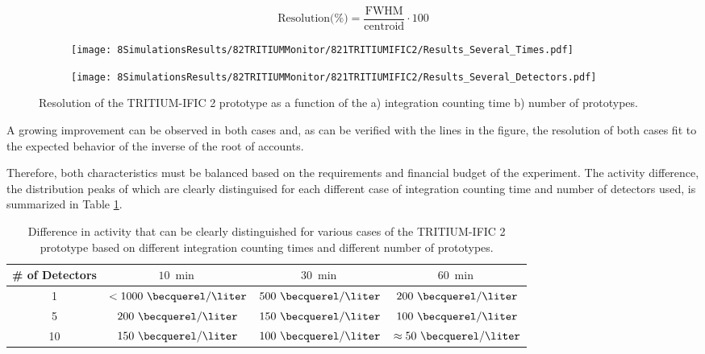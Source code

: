 \begin{equation}
\text{Resolution(\%)}=\frac{\text{FWHM}}{\text{centroid}}\cdot{}100
\label{eq:Resolution}
\end{equation}

\begin{figure}
\centering
    \begin{subfigure}[b]{0.45\textwidth}
    \centering
    \texttt{[image: 8SimulationsResults/82TRITIUMMonitor/821TRITIUMIFIC2/Results\_Several\_Times.pdf]}  
    \caption{\label{subfig:ResolutionvsIntegrationCoutingTime}}
    \end{subfigure}
    \hfill
    \begin{subfigure}[b]{0.45\textwidth}
    \centering
    \texttt{[image: 8SimulationsResults/82TRITIUMMonitor/821TRITIUMIFIC2/Results\_Several\_Detectors.pdf]}  
    \caption{\label{subfig:ResolutionvsNumberDetectors}}
    \end{subfigure}
 \caption{Resolution of the TRITIUM-IFIC 2 prototype as a function of the a) integration counting time b) number of prototypes.}
 \label{fig:Resolution}
\end{figure}

A growing improvement can be observed in both cases and, as can be verified with the lines in the figure, the resolution of both cases fit to the expected behavior of the inverse of the root of accounts.

Therefore, both characteristics must be balanced based on the requirements and financial budget of the experiment. The activity difference, the distribution peaks of which are clearly distinguised for each different case of integration counting time and number of detectors used, is summarized in Table \ref{tab:DifferentCasesOfTI2}.

\begin{table}[h]
\begin{center}
\begin{tabular}{|c|c|c|c|}
\hline
\# of Detectors & $10~\min$ & $30~\min$ & $60~\min$\\
\hline \hline \hline
1 & $<1000~\becquerel/\liter$ & $500~\becquerel/\liter$ & $200~\becquerel/\liter$ \\ \hline
5 & $200~\becquerel/\liter$ & $150~\becquerel/\liter$ & $100~\becquerel/\liter$ \\\hline
10 & $150~\becquerel/\liter$ & $100~\becquerel/\liter$ & $\approx 50~\becquerel/\liter$ \\ \hline
\end{tabular}
\caption{Difference in activity that can be clearly distinguished for various cases of the TRITIUM-IFIC 2 prototype based on different integration counting times and different number of prototypes.}
\label{tab:DifferentCasesOfTI2}
\end{center}
\end{table}

